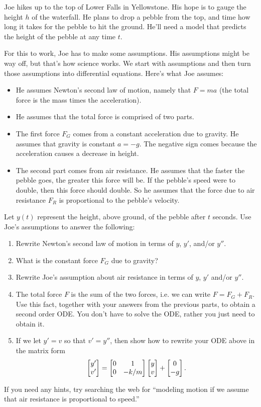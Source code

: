 \begin{problem}\label{pebble from falls}
 Joe hikes up to the top of Lower Falls in Yellowstone.  His hope is to gauge the height $h$ of the waterfall.  He plans to drop a pebble from the top, and time how long it takes for the pebble to hit the ground. He'll need a model that predicts the height of the pebble at any time $t$.

 For this to work, Joe has to make some assumptions.  His assumptions might be way off, but that's how science works. We start with assumptions and then turn those assumptions into differential equations. Here's what Joe assumes:
\begin{itemize}
 \item He assumes Newton's second law of motion, namely that $F=ma$ (the total force is the mass times the acceleration).
 \item He assumes that the total force is comprised of two parts.  
 \item The first force $F_G$ comes from a constant acceleration due to gravity. He assumes that gravity is constant $a=-g$. The negative sign comes because the acceleration causes a decrease in height.
 \item The second part comes from air resistance. He assumes that the faster the pebble goes, the greater this force will be. If the pebble's speed were to double, then this force should double.  So he assumes that the force due to air resistance $F_R$ is proportional to the pebble's velocity.
\end{itemize}
Let $y(t)$ represent the height, above ground, of the pebble after $t$ seconds. Use Joe's assumptions to answer the following:
\begin{enumerate}
 \item Rewrite Newton's second law of motion in terms of $y$, $y'$, and/or $y''$. 
 \item What is the constant force $F_G$ due to gravity?
 \item Rewrite Joe's assumption about air resistance in terms of $y$, $y'$ and/or $y''$. 
 \item The total force $F$ is the sum of the two forces, i.e. we can write $F = F_G+F_R$. Use this fact, together with your answers from the previous parts, to obtain a second order ODE.  You don't have to solve the ODE, rather you just need to obtain it.
 \item If we let $y'=v$ so that $v'=y''$, then show how to rewrite your ODE above in the matrix form 
$$\begin{bmatrix} y'\\v' \end{bmatrix} = \begin{bmatrix} 0&1\\0&-k/m \end{bmatrix}\begin{bmatrix} y\\v \end{bmatrix}+\begin{bmatrix} 0\\-g \end{bmatrix}.$$
\end{enumerate}
If you need any hints, try searching the web for ``modeling motion if we assume that air resistance is proportional to speed.''
\end{problem}


